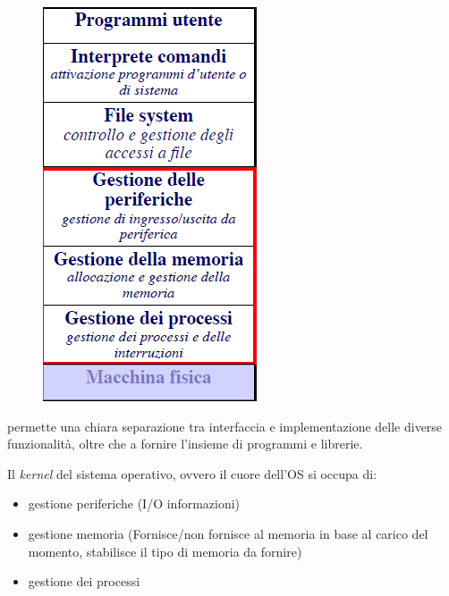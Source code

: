 \documentclass[
  paper=a4,
  oneside  ,captions=tableheading
]{scrbook}
\providecommand{\tightlist}{%
  \setlength{\itemsep}{0pt}\setlength{\parskip}{0pt}}
\begin{document}
\begin{figure}
\includegraphics[width=0.9\linewidth]{./image/image-2020112323365770.png}
\end{figure}
permette una chiara separazione tra interfaccia e implementazione delle
diverse funzionalità, oltre che a fornire l'insieme di programmi e
librerie.



Il \emph{kernel} del sistema operativo, ovvero il cuore dell'OS si
occupa di:

\begin{itemize}
\tightlist
\item
  gestione periferiche (I/O informazioni)
\item
  gestione memoria (Fornisce/non fornisce al memoria in base al carico
  del momento, stabilisce il tipo di memoria da fornire)
\item
  gestione dei processi
\end{itemize}
\end{document}
